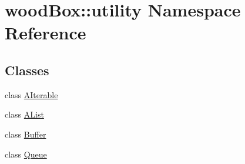 \hypertarget{namespacewood_box_1_1utility}{}\section{wood\+Box\+:\+:utility Namespace Reference}
\label{namespacewood_box_1_1utility}
\subsection*{Classes}
\begin{DoxyCompactItemize}
\item 
class \mbox{\hyperlink{classwood_box_1_1utility_1_1_a_iterable}{A\+Iterable}}
\item 
class \mbox{\hyperlink{classwood_box_1_1utility_1_1_a_list}{A\+List}}
\item 
class \mbox{\hyperlink{classwood_box_1_1utility_1_1_buffer}{Buffer}}
\item 
class \mbox{\hyperlink{classwood_box_1_1utility_1_1_queue}{Queue}}
\end{DoxyCompactItemize}
